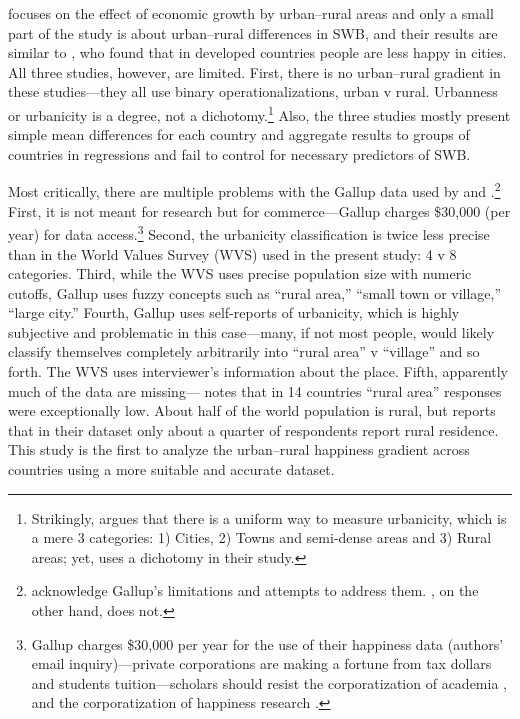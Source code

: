 \documentclass[10pt, letterpaper]{article}
\begin{document}
\citet{easterlin10al} focuses on the effect of economic growth by urban--rural areas and only a small part of the study is about urban--rural differences in SWB, and their results are similar to \citet{aokcities}, who found that in developed countries people are less happy in cities. All three studies, however, are limited. 
%
First, there is no urban--rural gradient in these studies---they all use binary operationalizations, urban v rural. %
 Urbanness or urbanicity is a degree, not a dichotomy.\footnote{Strikingly, \citet{burger20} argues that there is a uniform way to measure urbanicity, which is a mere 3 categories: 1)
Cities, 2) Towns and semi-dense areas and 3) Rural areas; yet, uses a dichotomy
in their study.} Also, the three studies mostly present simple mean differences for each country and aggregate results to groups of countries in regressions and fail to control for necessary predictors of SWB. 

Most critically, there are multiple problems with the Gallup data used by \citet{easterlin10al} and \citet{burger20}.\footnote{\citet{easterlin10al} acknowledge Gallup's limitations and attempts
to address them. \citet{burger20}, on the other hand, does not.}  First, it is not meant for
research but for commerce---Gallup charges \$30,000 (per year) for data access.\footnote{Gallup charges \$30,000 per year for the use of their happiness data (authors'
email inquiry)---private corporations are making a fortune from tax dollars and students tuition---scholars should resist the corporatization of academia \citep{mills2012corporatization,cox2013corporatization,millsNYT12fa,CatropaNYT20feb8,schmidlinNYT15oct10}, and
the corporatization of happiness research \citep{davies15}.} Second, the urbanicity classification is twice less precise than in the World Values Survey (WVS) used in the present study: 4
v 8 categories. Third, while the WVS uses precise population size with numeric cutoffs,
Gallup uses fuzzy concepts such as ``rural area,'' ``small town or village,'' ``large city.''
Fourth, %
Gallup uses self-reports of urbanicity, which is highly
subjective and problematic in this case---many, if not most people, would likely
classify themselves completely arbitrarily into ``rural area'' v ``village'' and so forth. The WVS uses interviewer's information about the place. Fifth, apparently much of the data are missing---\citet{easterlin10al} notes that in 14 countries ``rural area'' responses were exceptionally low.
 About half of the world population is rural, but \citet{burger20} reports that in their
dataset only about a quarter of respondents report rural residence.
%
This study is the first to analyze the urban--rural happiness gradient across countries using a more suitable and accurate dataset. 
\end{document}
